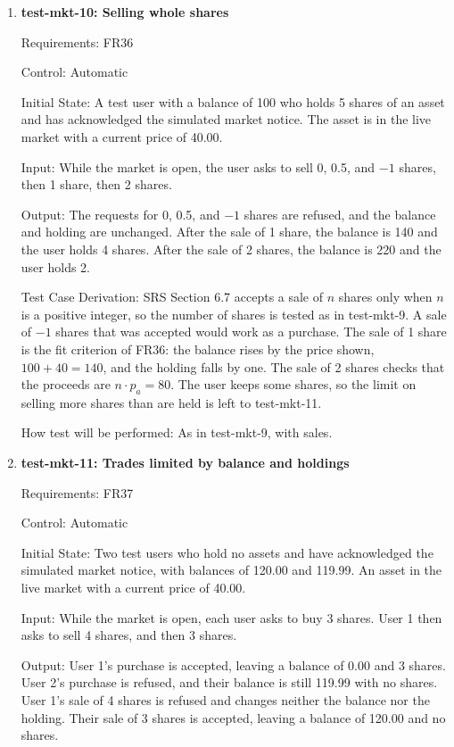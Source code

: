 \documentclass[12pt, titlepage]{article}
\begin{document}
\begin{enumerate}
How test will be performed: A pytest test sends each purchase and reads the
balance and holdings through the API after each one.

\item{\textbf{test-mkt-10: Selling whole shares}\\}

Requirements: FR36

Control: Automatic

Initial State: A test user with a balance of 100 who holds 5 shares of an
asset and has acknowledged the simulated market notice. The asset is in the
live market with a current price of 40.00.

Input: While the market is open, the user asks to sell 0, 0.5, and $-1$
shares, then 1 share, then 2 shares.

Output: The requests for 0, 0.5, and $-1$ shares are refused, and the balance
and holding are unchanged. After the sale of 1 share, the balance is 140 and
the user holds 4 shares. After the sale of 2 shares, the balance is 220 and
the user holds 2.

Test Case Derivation: SRS Section 6.7 accepts a sale of $n$ shares only when
$n$ is a positive integer, so the number of shares is tested as in
test-mkt-9. A sale of $-1$ shares that was accepted would work as a purchase.
The sale of 1 share is the fit criterion of FR36: the balance rises by the
price shown, $100 + 40 = 140$, and the holding falls by one. The sale of 2
shares checks that the proceeds are $n \cdot p_a = 80$. The user keeps some
shares, so the limit on selling more shares than are held is left to
test-mkt-11.

How test will be performed: As in test-mkt-9, with sales.

\item{\textbf{test-mkt-11: Trades limited by balance and holdings}\\}

Requirements: FR37

Control: Automatic

Initial State: Two test users who hold no assets and have acknowledged the
simulated market notice, with balances of 120.00 and 119.99. An asset in the
live market with a current price of 40.00.

Input: While the market is open, each user asks to buy 3 shares. User 1 then
asks to sell 4 shares, and then 3 shares.

Output: User 1's purchase is accepted, leaving a balance of 0.00 and 3 shares.
User 2's purchase is refused, and their balance is still 119.99 with no
shares. User 1's sale of 4 shares is refused and changes neither the balance
nor the holding. Their sale of 3 shares is accepted, leaving a balance of
120.00 and no shares.


\end{enumerate}
\end{document}
